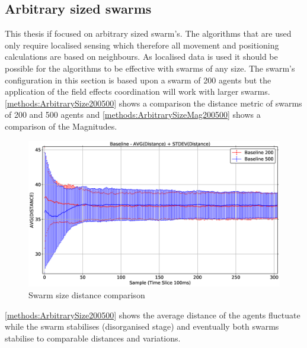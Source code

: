 \subsection{Arbitrary sized swarms}\label{section:arbitrary}
This thesis if focused on arbitrary sized swarm's. The algorithms that are used only require localised sensing which therefore all movement and positioning calculations are based on neighbours. As localised data is used it should be possible for the algorithms to be effective with swarms of any size. The swarm's configuration in this section is based upon a swarm of 200 agents but the application of the field effects coordination will work with larger swarms. \autoref{methods:ArbitrarySize200500} shows a comparison the distance metric of swarms of 200 and 500 agents and \autoref{methods:ArbitrarySizeMag200500} shows a comparison of the Magnitudes.

\begin{figure}[H]
\begin{center}
\includegraphics[width=13cm]{CHAPTER-5/figures/ArbitrarySize200500}
\end{center}
\caption{Swarm size distance comparison\label{methods:ArbitrarySize200500}}
\end{figure}

\autoref{methods:ArbitrarySize200500} shows the average distance of the agents fluctuate while the swarm stabilises (disorganised stage) and eventually both swarms stabilise to comparable distances and variations. 

